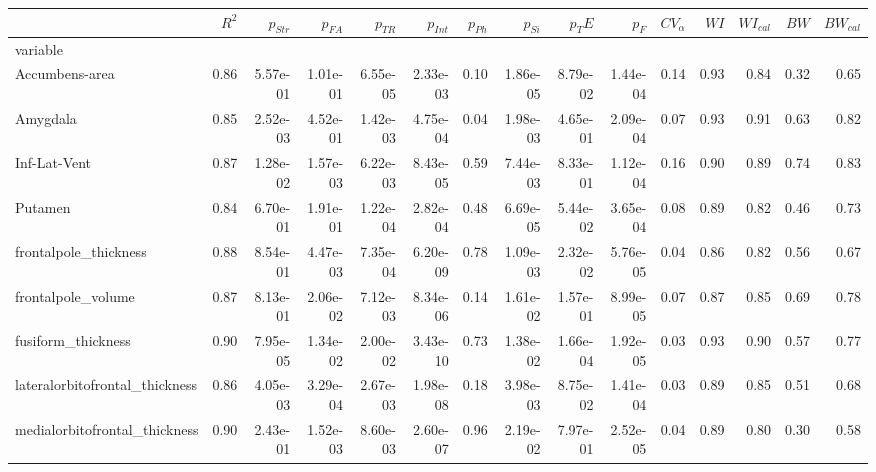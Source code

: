 \begin{table}
\begin{tabular}{lrrrrrrrrrrrrrr}
\toprule
{} &    $R^2$ &  $p_{Str}$ &  $p_{FA}$ &      $p_{TR}$ &  $p_{Int}$ &  $p_{Ph}$ &  $p_{Si}$ &      $p_TE$ &       $p_F$ &   $CV_{\alpha}$ &    $WI$ &  $WI_{cal}$ &    $BW$ &  $BW_{cal}$ \\
\midrule
variable                           &       &             &              &           &              &               &               &           &           &       &       &         &       &         \\
Accumbens-area                     &  0.86 &    5.57e-01 &     1.01e-01 &  6.55e-05 &     2.33e-03 &          0.10 &      1.86e-05 &  8.79e-02 &  1.44e-04 &  0.14 &  0.93 &    0.84 &  0.32 &    0.65 \\
Amygdala                           &  0.85 &    2.52e-03 &     4.52e-01 &  1.42e-03 &     4.75e-04 &          0.04 &      1.98e-03 &  4.65e-01 &  2.09e-04 &  0.07 &  0.93 &    0.91 &  0.63 &    0.82 \\
Inf-Lat-Vent                       &  0.87 &    1.28e-02 &     1.57e-03 &  6.22e-03 &     8.43e-05 &          0.59 &      7.44e-03 &  8.33e-01 &  1.12e-04 &  0.16 &  0.90 &    0.89 &  0.74 &    0.83 \\
Putamen                            &  0.84 &    6.70e-01 &     1.91e-01 &  1.22e-04 &     2.82e-04 &          0.48 &      6.69e-05 &  5.44e-02 &  3.65e-04 &  0.08 &  0.89 &    0.82 &  0.46 &    0.73 \\
frontalpole\_thickness              &  0.88 &    8.54e-01 &     4.47e-03 &  7.35e-04 &     6.20e-09 &          0.78 &      1.09e-03 &  2.32e-02 &  5.76e-05 &  0.04 &  0.86 &    0.82 &  0.56 &    0.67 \\
frontalpole\_volume                 &  0.87 &    8.13e-01 &     2.06e-02 &  7.12e-03 &     8.34e-06 &          0.14 &      1.61e-02 &  1.57e-01 &  8.99e-05 &  0.07 &  0.87 &    0.85 &  0.69 &    0.78 \\
fusiform\_thickness                 &  0.90 &    7.95e-05 &     1.34e-02 &  2.00e-02 &     3.43e-10 &          0.73 &      1.38e-02 &  1.66e-04 &  1.92e-05 &  0.03 &  0.93 &    0.90 &  0.57 &    0.77 \\
lateralorbitofrontal\_thickness     &  0.86 &    4.05e-03 &     3.29e-04 &  2.67e-03 &     1.98e-08 &          0.18 &      3.98e-03 &  8.75e-02 &  1.41e-04 &  0.03 &  0.89 &    0.85 &  0.51 &    0.68 \\
medialorbitofrontal\_thickness      &  0.90 &    2.43e-01 &     1.52e-03 &  8.60e-03 &     2.60e-07 &          0.96 &      2.19e-02 &  7.97e-01 &  2.52e-05 &  0.04 &  0.89 &    0.80 &  0.30 &    0.58 \\

\end{tabular}
\end{table}
